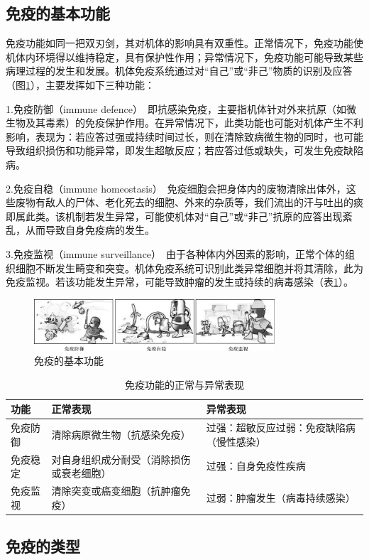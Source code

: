 \subsection{免疫的基本功能}

免疫功能如同一把双刃剑，其对机体的影响具有双重性。正常情况下，免疫功能使机体内环境得以维持稳定，具有保护性作用；异常情况下，免疫功能可能导致某些病理过程的发生和发展。机体免疫系统通过对“自己”或“非己”物质的识别及应答（图\ref{fig1-1}），主要发挥如下三种功能：

1.免疫防御（immune
defence）　即抗感染免疫，主要指机体针对外来抗原（如微生物及其毒素）的免疫保护作用。在异常情况下，此类功能也可能对机体产生不利影响，表现为：若应答过强或持续时间过长，则在清除致病微生物的同时，也可能导致组织损伤和功能异常，即发生超敏反应；若应答过低或缺失，可发生免疫缺陷病。

2.免疫自稳（immune
homeostasis）　免疫细胞会把身体内的废物清除出体外，这些废物有敌人的尸体、老化死去的细胞、外来的杂质等，我们流出的汗与吐出的痰即属此类。该机制若发生异常，可能使机体对“自己”或“非己”抗原的应答出现紊乱，从而导致自身免疫病的发生。

3.免疫监视（immune
surveillance）　由于各种体内外因素的影响，正常个体的组织细胞不断发生畸变和突变。机体免疫系统可识别此类异常细胞并将其清除，此为免疫监视。若该功能发生异常，可能导致肿瘤的发生或持续的病毒感染（表\ref{tab1-1}）。

\begin{figure}[!htbp]
 \centering
 \includegraphics[width=0.8\textwidth]{./images/Image00008.jpg}
 \caption{免疫的基本功能}
 \label{fig1-1}
  \end{figure} 

\begin{longtable}[]{@{}lll@{}}
\caption{免疫功能的正常与异常表现}
\label{tab1-1}\\
\toprule
功能 & 正常表现 & 异常表现\tabularnewline
\midrule
\endhead
免疫防御 & 清除病原微生物（抗感染免疫） &
过强：超敏反应过弱：免疫缺陷病（慢性感染）\tabularnewline
免疫稳定 & 对自身组织成分耐受（消除损伤或衰老细胞） &
过强：自身免疫性疾病\tabularnewline
免疫监视 & 清除突变或癌变细胞（抗肿瘤免疫） &
过弱：肿瘤发生（病毒持续感染）\tabularnewline
\bottomrule
\end{longtable}


\subsection{免疫的类型}


